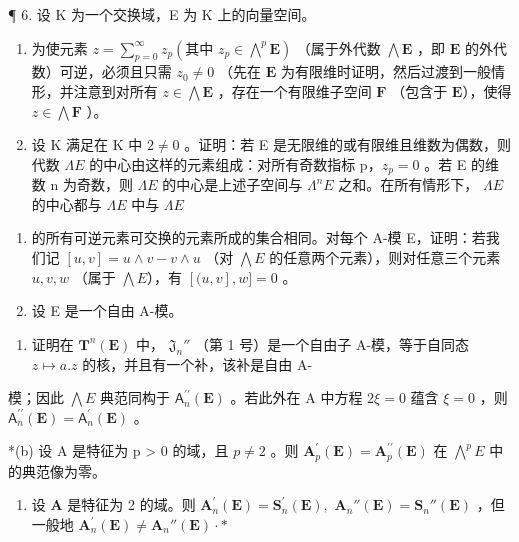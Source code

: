 ¶ 6. 设 K 为一个交换域，E 为 K 上的向量空间。

\begin{enumerate}
\def\labelenumi{(\alph{enumi})}
\item
  为使元素 \(z = \sum_{p=0}^{\infty} z_p \left( \text{其中 } z_p \in \bigwedge^p \mathbf{E} \right)\) （属于外代数 \(\bigwedge \mathbf{E}\) ，即 \(\mathbf{E}\) 的外代数）可逆，必须且只需 \(z_0 \neq 0\) （先在 \(\mathbf{E}\) 为有限维时证明，然后过渡到一般情形，并注意到对所有 \(z \in \bigwedge \mathbf{E}\) ，存在一个有限维子空间 \(\mathbf{F}\) （包含于 \(\mathbf{E}\)），使得 \(z \in \bigwedge \mathbf{F}\) ）。
\item
  设 K 满足在 K 中 \(2 \neq 0\) 。证明：若 E 是无限维的或有限维且维数为偶数，则代数 \(\Lambda E\) 的中心由这样的元素组成：对所有奇数指标 p，\(z_{p} = 0\) 。若 E 的维数 n 为奇数，则 \(\Lambda E\) 的中心是上述子空间与 \(\Lambda^{n}E\) 之和。在所有情形下， \(\Lambda E\) 的中心都与 \(\Lambda E\) 中与 \(\Lambda E\)
\end{enumerate}

\begin{enumerate}
\def\labelenumi{\arabic{enumi}.}
\setcounter{enumi}{6}
\item
  的所有可逆元素可交换的元素所成的集合相同。对每个 A-模 E，证明：若我们记 \([u, v] = u \wedge v - v \wedge u\) （对 \(\bigwedge E\) 的任意两个元素），则对任意三个元素 \(u, v, w\) （属于 \(\bigwedge E\)），有 \([(u, v], w] = 0\) 。
\item
  设 E 是一个自由 A-模。
\end{enumerate}

\begin{enumerate}
\def\labelenumi{(\alph{enumi})}
\tightlist
\item
  证明在 \(\mathbf{T}^n (\mathbf{E})\) 中， \(\mathfrak{J}_n''\) （第 1 号）是一个自由子 A-模，等于自同态 \(z\mapsto a.z\) 的核，并且有一个补，该补是自由 A-
\end{enumerate}

模；因此 \(\bigwedge E\) 典范同构于 \(\mathsf{A}_n^{\prime \prime}(\mathbf{E})\) 。若此外在 A 中方程 \(2\xi = 0\) 蕴含 \(\xi = 0\) ，则 \(\mathsf{A}_n^{\prime \prime}(\mathbf{E}) = \mathsf{A}_n^{\prime}(\mathbf{E})\) 。

*(b) 设 A 是特征为 p \textgreater{} 0 的域，且 \(p \neq 2\) 。则 \(\mathbf{A}_{p}^{\prime}(\mathbf{E}) = \mathbf{A}_{p}^{\prime\prime}(\mathbf{E})\) 在 \(\bigwedge^{p} E\) 中的典范像为零。

\begin{enumerate}
\def\labelenumi{(\alph{enumi})}
\setcounter{enumi}{2}
\tightlist
\item
  设 \(\mathbf{A}\) 是特征为 2 的域。则 \(\mathbf{A}_n^\prime (\mathbf{E}) = \mathbf{S}_n^\prime (\mathbf{E}),\) \(\mathbf{A}_n''(\mathbf{E}) = \mathbf{S}_n''(\mathbf{E})\) ，但一般地 \(\mathbf{A}_n^\prime (\mathbf{E})\neq \mathbf{A}_n''(\mathbf{E})\cdot *\)
\end{enumerate}

